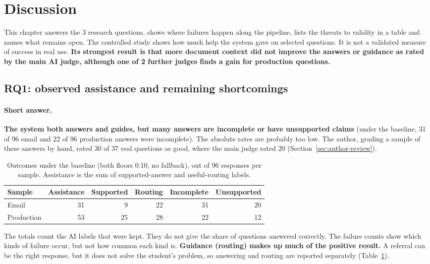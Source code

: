 \section{Discussion}
\label{ch:discussion}

This chapter answers the 3 research questions, shows where failures happen along the pipeline, lists the threats to validity in a table and names what remains open. The controlled study shows how much help the system gave on selected questions. It is not a validated measure of success in real use. \textbf{Its strongest result is that more document context did not improve the answers or guidance as rated by the main AI judge, although one of 2 further judges finds a gain for production questions.}

\subsection{RQ1: observed assistance and remaining shortcomings}

\paragraph{Short answer.} \textbf{The system both answers and guides, but many answers are incomplete or have unsupported claims} (under the baseline, 31 of 96 email and 22 of 96 production answers were incomplete). The absolute rates are probably too low. The author, grading a sample of these answers by hand, rated 30 of 37 real questions as good, where the main judge rated 20 (Section~\ref{sec:author-review}).

\begin{table}[htbp]
\centering
\caption[Outcomes under the baseline, out of 96 responses per sample]{Outcomes under the baseline (both floors 0.10, no fallback), out of 96 responses per sample. Assistance is the sum of supported-answer and useful-routing labels.}
\label{tab:rq1-g0}
\small
\begin{tabular}{@{}lrrrrr@{}}
\toprule
Sample & Assistance & Supported & Routing & Incomplete & Unsupported \\
\midrule
Email & 31 & 9 & 22 & 31 & 20 \\
Production & 53 & 25 & 28 & 22 & 12 \\
\bottomrule
\end{tabular}
\end{table}

The totals count the AI labels that were kept. They do not give the share of questions answered correctly. The failure counts show which kinds of failure occur, but not how common each kind is. \textbf{Guidance (routing) makes up much of the positive result.} A referral can be the right response, but it does not solve the student's problem, so answering and routing are reported separately (Table~\ref{tab:rq1-g0}).

